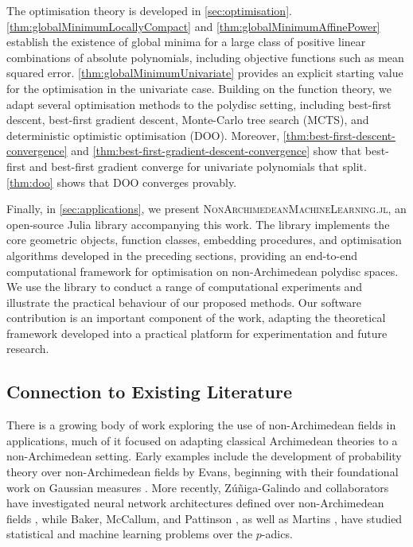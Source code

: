 \documentclass[10pt]{article}
\theoremstyle{definition}
\begin{document}
The optimisation theory is developed in \cref{sec:optimisation}. \cref{thm:globalMinimumLocallyCompact} and \cref{thm:globalMinimumAffinePower} establish the existence of global minima for a large class of positive linear combinations of absolute polynomials, including objective functions such as mean squared error. \cref{thm:globalMinimumUnivariate} provides an explicit starting value for the optimisation in the univariate case. Building on the function theory, we adapt several optimisation methods to the polydisc setting, including best-first descent, best-first gradient descent, Monte-Carlo tree search (MCTS), and deterministic optimistic optimisation (DOO).  Moreover, \cref{thm:best-first-descent-convergence} and \cref{thm:best-first-gradient-descent-convergence} show that best-first and best-first gradient converge for univariate polynomials that split. \cref{thm:doo} shows that DOO converges provably.

Finally, in \cref{sec:applications}, we present \textsc{NonArchimedeanMachineLearning.jl}, an open-source Julia library accompanying this work. The library implements the core geometric objects, function classes, embedding procedures, and optimisation algorithms developed in the preceding sections, providing an end-to-end computational framework for optimisation on non-Archimedean polydisc spaces. We use the library to conduct a range of computational experiments and illustrate the practical behaviour of our proposed methods. Our software contribution is an important component of the work, adapting the theoretical framework developed into a practical platform for experimentation and future research.

\subsection{Connection to Existing Literature}
There is a growing body of work exploring the use of non-Archimedean fields in applications, much of it focused on adapting classical Archimedean theories to a non-Archimedean setting. Early examples include the development of probability theory over non-Archimedean fields by Evans, beginning with their foundational work on Gaussian measures \cite{Evans1989}. More recently, Zúñiga-Galindo and collaborators have investigated neural network architectures defined over non-Archimedean fields \cite{zuniga2024deep,zuniga2024hierarchical}, while Baker, McCallum, and Pattinson \cite{BMP2025}, as well as Martins \cite{martins2025learning}, have studied statistical and machine learning problems over the $p$-adics.
\end{document}
